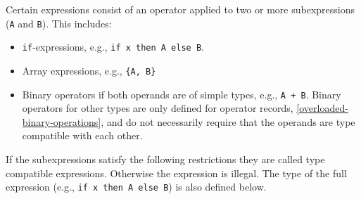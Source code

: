 Certain expressions consist of an operator applied to two or more subexpressions (\lstinline!A! and \lstinline!B!).
This includes:
\begin{itemize}
\item \lstinline!if!-expressions, e.g., \lstinline!if x then A else B!.
\item Array expressions, e.g., \lstinline!{A, B}!
\item Binary operators if both operands are of simple types, e.g., \lstinline!A + B!.
Binary operators for other types are only defined for operator records, \cref{overloaded-binary-operations}, and do not necessarily require that the operands are type compatible with each other.
\end{itemize}
If the subexpressions satisfy the following restrictions they are called type compatible expressions.
Otherwise the expression is illegal.
The type of the full expression (e.g., \lstinline!if x then A else B!) is also defined below.
